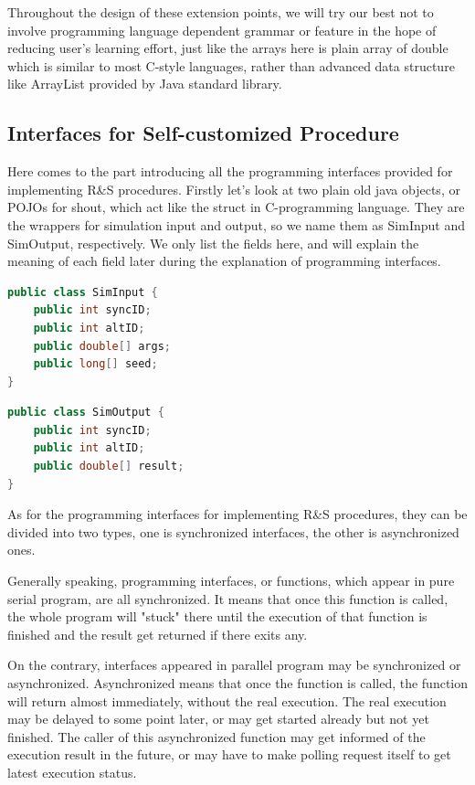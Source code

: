\documentclass[12pt,a4paper]{report}
\begin{document}
Throughout the design of these extension points, we will try our best not to involve programming language dependent grammar or feature in the hope of reducing user's learning effort, just like the arrays here is plain array of double which is similar to most C-style languages, rather than advanced data structure like ArrayList provided by Java standard library.

\subsection{Interfaces for Self-customized Procedure}

Here comes to the part introducing all the programming interfaces provided for implementing R\&S procedures. Firstly let's look at two plain old java objects, or POJOs for shout, which act like the struct in C-programming language. They are the wrappers for simulation input and output, so we name them as SimInput and SimOutput, respectively. We only list the fields here, and will explain the meaning of each field later during the explanation of programming interfaces.

\begin{lstlisting}[language=Java]
public class SimInput {
	public int syncID;
	public int altID;
	public double[] args;
	public long[] seed;
}
\end{lstlisting}

\begin{lstlisting}[language=Java]
public class SimOutput {
	public int syncID;
	public int altID;
	public double[] result;
}
\end{lstlisting}

As for the programming interfaces for implementing R\&S procedures, they can be divided into two types, one is synchronized interfaces, the other is asynchronized ones.

Generally speaking, programming interfaces, or functions, which appear in pure serial program, are all synchronized. It means that once this function is called, the whole program will "stuck" there until the execution of that function is finished and the result get returned if there exits any.

On the contrary, interfaces appeared in parallel program may be synchronized or asynchronized. Asynchronized means that once the function is called, the function will return almost immediately, without the real execution. The real execution may be delayed to some point later, or may get started already but not yet finished. The caller of this asynchronized function may get informed of the execution result in the future, or may have to make polling request itself to get latest execution status.
\end{document}
